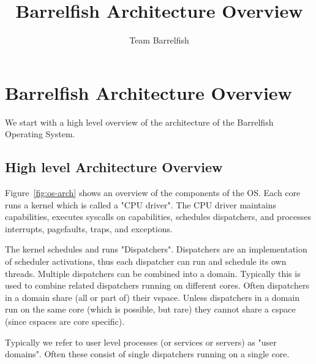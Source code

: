 \documentclass[a4paper,twoside]{report} %
\title{Barrelfish Architecture Overview}   %
\author{Team Barrelfish}	%
\begin{document}
\maketitle

%
%
\begin{versionhistory}
\end{versionhistory}




\chapter{Barrelfish Architecture Overview}

We start with a high level overview of the architecture of the Barrelfish
Operating System.

\section{High level Architecture Overview}\label{sec:overview}
Figure~\ref{fig:os-arch} shows an overview of the components of the OS.  Each
core runs a kernel which is called a "CPU driver". The CPU driver maintains
capabilities, executes syscalls on capabilities, schedules dispatchers, and
processes interrupts, pagefaults, traps, and exceptions.

The kernel schedules and runs "Dispatchers". Dispatchers are an implementation
of scheduler activations, thus each dispatcher can run and schedule its own
threads.  Multiple dispatchers can be combined into a domain. Typically this is
used to combine related dispatchers running on different cores. Often
dispatchers in a domain share (all or part of) their vspace. Unless dispatchers
in a domain run on the same core (which is possible, but rare) they cannot share
a cspace (since cspaces are core specific).

Typically we refer to user level processes (or services or servers) as "user
domains". Often these consist of single dispatchers running on a single core.
\end{document}
